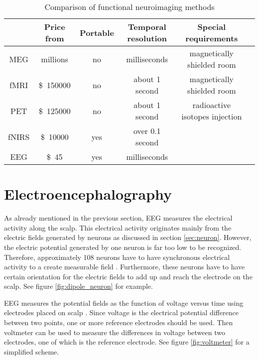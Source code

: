 
\begin{table}[h]
	\centering
	\begin{tabular}{|c|c|c|c|c|c|}\hline
			& Price	from				& Portable	& Temporal resolution		& Special requirements			\\\hline
\gls{MEG}	& millions\pMEG				& no		& milliseconds \tresol		& magnetically shielded room	\\\hline
\gls{fMRI}	& \SI{150000}[\$]\pfMRI		& no		& about 1 second \tresol	& magnetically shielded room	\\\hline
\gls{PET}	& \SI{125000}[\$]\pPET		& no		& about 1 second \tresol	& radioactive isotopes injection\\\hline
\gls{fNIRS}	& \SI{10000}[\$]{} \pNIRS	& yes		& over 0.1 second \pNIRS	&								\\\hline
\gls{EEG}	& \SI{45}[\$]\pEEG			& yes		& milliseconds \tresol		&								\\\hline
	\end{tabular}
	\caption{Comparison of functional neuroimaging methods}
	\label{tab:neuroimaging}
\end{table}

\section{Electroencephalography}
\label{sec:EEG}

As already mentioned in the previous section, \gls{EEG} measures the electrical activity along the scalp. This electrical activity originates mainly from the electric fields generated by neurons as discussed in section \ref{sec:neuron}. However, the electric potential generated by one neuron is far too low to be recognized. Therefore, approximately 108 neurons have to have synchronous electrical activity to a create measurable field \cite{field_count}. Furthermore, these neurons have to have certain orientation for the electric fields to add up and reach the electrode on the scalp. See figure \ref{fig:dipole_neuron} for example.

\gls{EEG} measures the potential fields as the function of voltage versus time using electrodes placed on scalp \cite{field_count}. Since voltage is the electrical potential difference between two points, one or more reference electrodes should be used. Then voltmeter can be used to measure the differences in voltage between two electrodes, one of which is the reference electrode. See figure \ref{fig:voltmeter} for a simplified scheme.

